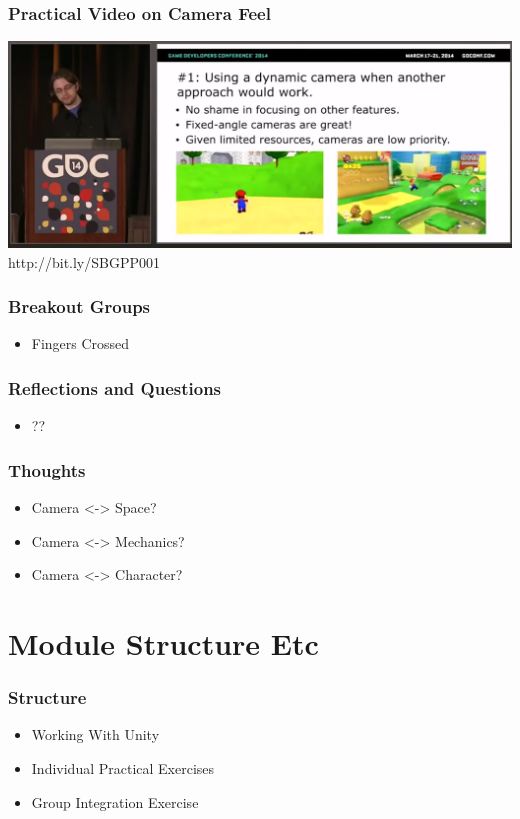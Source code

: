 \documentclass{beamer}
\begin{document}
\begin{frame}
    \frametitle{Practical Video on Camera Feel}
    \includegraphics[width=\textwidth]{cameravideoimage.png}
    http://bit.ly/SBGPP001
    \newline
    \href{http://bit.ly/SBGPP001}{
    }
\end{frame}


\begin{frame}
    \frametitle{Breakout Groups}
    \begin{itemize}
        \item Fingers Crossed
    \end{itemize}
\end{frame}

\begin{frame}
    \frametitle{Reflections and Questions}
    \begin{itemize}
        \item ??
    \end{itemize}

\end{frame}

\begin{frame}
    \frametitle{Thoughts}
    \begin{itemize}
        \item Camera <-> Space?
        \item Camera <-> Mechanics?
        \item Camera <-> Character?
    \end{itemize}
\end{frame}

\section{Module Structure Etc}

\begin{frame}
    \frametitle{Structure}
    \begin{itemize}
        \item Working With Unity
        \item Individual Practical Exercises
        \item Group Integration Exercise
    \end{itemize}
\end{frame}
\end{document}
